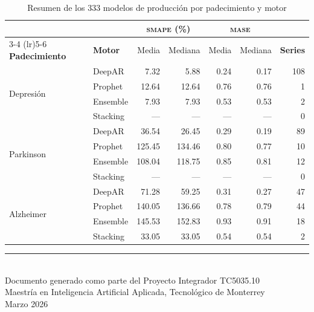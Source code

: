 \documentclass[12pt, letterpaper]{article}
\newcommand{\smape}{\textnormal{\textsc{smape}}}
\newcommand{\mase}{\textnormal{\textsc{mase}}}
\begin{document}
\begin{table}[H]
\centering
\caption{Resumen de los 333 modelos de producción por padecimiento y motor}
\label{tab:resumen_333}
\scriptsize
\setlength{\tabcolsep}{3pt}
\begin{tabularx}{\textwidth}{X l rr rr r}
\toprule
& & \multicolumn{2}{c}{\smape{} (\%)} & \multicolumn{2}{c}{\mase{}} & \\
\cmidrule(lr){3-4} \cmidrule(lr){5-6}
\textbf{Padecimiento} & \textbf{Motor} & Media & Mediana & Media & Mediana & \textbf{Series} \\
\midrule
\multirow{4}{*}{Depresión} & DeepAR & 7.32 & 5.88 & 0.24 & 0.17 & 108 \\
& Prophet & 12.64 & 12.64 & 0.76 & 0.76 & 1 \\
& Ensemble & 7.93 & 7.93 & 0.53 & 0.53 & 2 \\
& Stacking & --- & --- & --- & --- & 0 \\
\midrule
\multirow{4}{*}{Parkinson} & DeepAR & 36.54 & 26.45 & 0.29 & 0.19 & 89 \\
& Prophet & 125.45 & 134.46 & 0.80 & 0.77 & 10 \\
& Ensemble & 108.04 & 118.75 & 0.85 & 0.81 & 12 \\
& Stacking & --- & --- & --- & --- & 0 \\
\midrule
\multirow{4}{*}{Alzheimer} & DeepAR & 71.28 & 59.25 & 0.31 & 0.27 & 47 \\
& Prophet & 140.05 & 136.66 & 0.78 & 0.79 & 44 \\
& Ensemble & 145.53 & 152.83 & 0.93 & 0.91 & 18 \\
& Stacking & 33.05 & 33.05 & 0.54 & 0.54 & 2 \\
\bottomrule
\end{tabularx}
\end{table}

\vspace{1cm}

\begin{center}
\textcolor{coolgray}{\rule{0.5\textwidth}{0.4pt}}\\[0.3cm]
{\small\textcolor{coolgray}{Documento generado como parte del Proyecto Integrador TC5035.10}}\\
{\small\textcolor{coolgray}{Maestría en Inteligencia Artificial Aplicada, Tecnológico de Monterrey}}\\
{\small\textcolor{coolgray}{Marzo 2026}}
\end{center}
\end{document}
